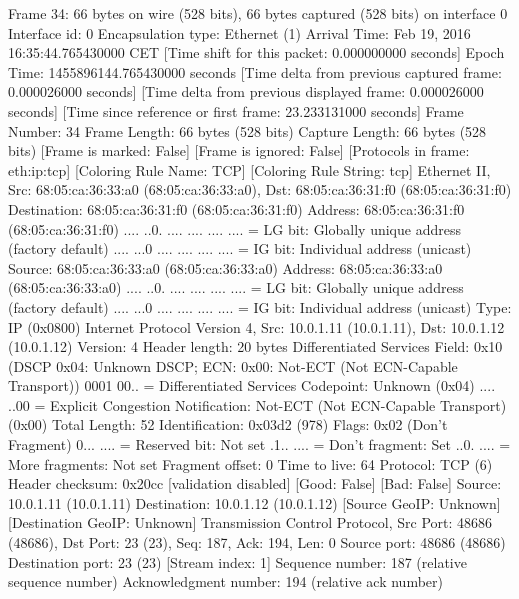 Frame 34: 66 bytes on wire (528 bits), 66 bytes captured (528 bits) on interface 0
    Interface id: 0
    Encapsulation type: Ethernet (1)
    Arrival Time: Feb 19, 2016 16:35:44.765430000 CET
    [Time shift for this packet: 0.000000000 seconds]
    Epoch Time: 1455896144.765430000 seconds
    [Time delta from previous captured frame: 0.000026000 seconds]
    [Time delta from previous displayed frame: 0.000026000 seconds]
    [Time since reference or first frame: 23.233131000 seconds]
    Frame Number: 34
    Frame Length: 66 bytes (528 bits)
    Capture Length: 66 bytes (528 bits)
    [Frame is marked: False]
    [Frame is ignored: False]
    [Protocols in frame: eth:ip:tcp]
    [Coloring Rule Name: TCP]
    [Coloring Rule String: tcp]
Ethernet II, Src: 68:05:ca:36:33:a0 (68:05:ca:36:33:a0), Dst: 68:05:ca:36:31:f0 (68:05:ca:36:31:f0)
    Destination: 68:05:ca:36:31:f0 (68:05:ca:36:31:f0)
        Address: 68:05:ca:36:31:f0 (68:05:ca:36:31:f0)
        .... ..0. .... .... .... .... = LG bit: Globally unique address (factory default)
        .... ...0 .... .... .... .... = IG bit: Individual address (unicast)
    Source: 68:05:ca:36:33:a0 (68:05:ca:36:33:a0)
        Address: 68:05:ca:36:33:a0 (68:05:ca:36:33:a0)
        .... ..0. .... .... .... .... = LG bit: Globally unique address (factory default)
        .... ...0 .... .... .... .... = IG bit: Individual address (unicast)
    Type: IP (0x0800)
Internet Protocol Version 4, Src: 10.0.1.11 (10.0.1.11), Dst: 10.0.1.12 (10.0.1.12)
    Version: 4
    Header length: 20 bytes
    Differentiated Services Field: 0x10 (DSCP 0x04: Unknown DSCP; ECN: 0x00: Not-ECT (Not ECN-Capable Transport))
        0001 00.. = Differentiated Services Codepoint: Unknown (0x04)
        .... ..00 = Explicit Congestion Notification: Not-ECT (Not ECN-Capable Transport) (0x00)
    Total Length: 52
    Identification: 0x03d2 (978)
    Flags: 0x02 (Don't Fragment)
        0... .... = Reserved bit: Not set
        .1.. .... = Don't fragment: Set
        ..0. .... = More fragments: Not set
    Fragment offset: 0
    Time to live: 64
    Protocol: TCP (6)
    Header checksum: 0x20cc [validation disabled]
        [Good: False]
        [Bad: False]
    Source: 10.0.1.11 (10.0.1.11)
    Destination: 10.0.1.12 (10.0.1.12)
    [Source GeoIP: Unknown]
    [Destination GeoIP: Unknown]
Transmission Control Protocol, Src Port: 48686 (48686), Dst Port: 23 (23), Seq: 187, Ack: 194, Len: 0
    Source port: 48686 (48686)
    Destination port: 23 (23)
    [Stream index: 1]
    Sequence number: 187    (relative sequence number)
    Acknowledgment number: 194    (relative ack number)

